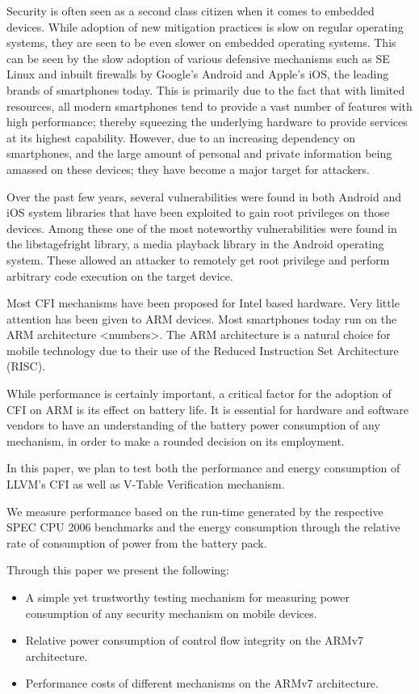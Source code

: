 \documentclass[letterpaper, 10 pt, conference]{ieeeconf}  %
\begin{document}
Security is often seen as a second class citizen when it comes to embedded devices. While adoption of new mitigation practices is slow on regular operating systems, they are seen to be even slower on embedded operating systems. This can be seen by the slow adoption of various defensive mechanisms such as SE Linux and inbuilt firewalls by Google's Android and Apple's iOS, the leading brands of smartphones today. This is primarily due to the fact that with limited resources, all modern smartphones tend to provide a vast number of features with high performance; thereby squeezing the underlying hardware to provide services at its highest capability. However, due to an increasing dependency on smartphones, and the large amount of personal and private information being amassed on these devices; they have become a major target for attackers.

Over the past few years, several vulnerabilities were found in both Android and iOS system libraries that have been exploited to gain root privileges on those devices. Among these one of the most noteworthy vulnerabilities were found in the libstagefright library, a media playback library in the Android operating system. These allowed an attacker to remotely get root privilege and perform arbitrary code execution on the target device.

Most CFI mechanisms have been proposed for Intel based hardware. Very little attention has been given to ARM devices. Most smartphones today run on the ARM architecture <numbers>. The ARM architecture is a natural choice for mobile technology due to their use of the Reduced Instruction Set Architecture (RISC).

While performance is certainly important, a critical factor for the adoption of CFI on ARM is its effect on battery life. It is essential for hardware and software vendors to have an understanding of the battery power consumption of any mechanism, in order to make a rounded decision on its employment.

In this paper, we plan to test both the performance and energy consumption of LLVM's CFI as well as V-Table Verification mechanism.

We measure performance based on the run-time generated by the respective SPEC CPU 2006 benchmarks and the energy consumption through the relative rate of consumption of power from the battery pack.

Through this paper we present the following:
\begin{itemize}
\item A simple yet trustworthy testing mechanism for measuring power consumption of any security mechanism on mobile devices.
\item Relative power consumption of control flow integrity on the ARMv7 architecture.
\item Performance costs of different mechanisms on the ARMv7 architecture.
\end{itemize}
\end{document}
